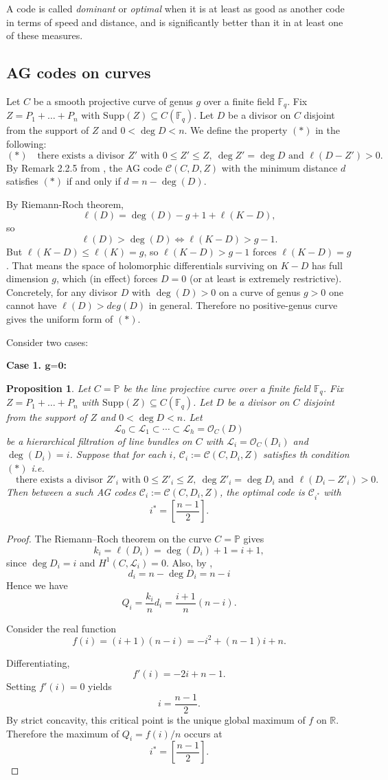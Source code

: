 \documentclass[14pt]{amsart}
\theoremstyle{plain}
\newtheorem{prop}[thm]{\bf Proposition}
\theoremstyle{definition}
\theoremstyle{remark}
\theoremstyle{example}
\def \P{\mathbb{P}}
\def \F{\mathbb{F}}
\def \RR{\mathbb{R}}
\def \L{\mathcal{L}}
\def \O{\mathcal{O}}
\def \C{\mathcal{C}}
\def \Supp{\mathrm{Supp}}
\begin{document}
A code is called \textit{dominant} or \textit{optimal} when it is at least as good as another code in terms of speed and distance, and is significantly better than it in at least one of these measures.

\subsection*{AG codes on curves}

Let $C$ be a smooth projective curve of genus $g$ over a finite field $\F_q$. Fix $Z=P_1+\ldots+P_n$ with $\Supp(Z)\subseteq C(\F_q)$. Let $D$ be a divisor on $C$ disjoint from the support of $Z$ and $0<\deg D<n$. We define the property $(*)$ in the following:
$$
(*)\quad\text{there exists a divisor }Z'\text{ with }0\leq Z'\leq Z,\ \deg Z'=\deg D\text{ and }\ell(D-Z')>0.
$$
By Remark 2.2.5 from \cite{St}, the AG code $\C(C,D,Z)$ with the minimum distance $d$ satisfies $(*)$ if and only if $d=n-\deg(D)$.

By Riemann-Roch theorem, 
$$\ell(D)=\deg(D)-g+1+\ell(K-D),$$
so
$$\ell(D)>\deg(D)\Longleftrightarrow\ell(K-D)>g-1.$$
But $\ell(K-D)\leq\ell(K)=g$, so $\ell(K-D)>g-1$ forces $\ell(K-D)=g$. That means the space of holomorphic differentials surviving on $K-D$ has full dimension $g$, which (in effect) forces $D=0$ (or at least is extremely restrictive). Concretely, for any divisor $D$ with 
$\deg(D)>0$ on a curve of genus $g>0$ one cannot have $\ell(D)>deg(D)$ in general. Therefore no positive-genus curve gives the uniform form of $(*)$. 

Consider two cases:

\noindent\textbf{Case 1. $\textbf{g=0}$:} 
\begin{prop} 
\label{prop:middle-layer-g=0}
Let $C=\P$ be the line projective curve over a finite field $\F_q$. Fix $Z=P_1+\ldots+P_n$ with $\Supp(Z)\subseteq C(\F_q)$. Let $D$ be a divisor on $C$ disjoint from the support of $Z$ and $0<\deg D<n$. 
Let $$\L_0\subset\L_1\subset\cdots\subset\L_h=\O_C(D)$$
be a hierarchical filtration of line bundles on $C$ with $\L_i=\O_C(D_i)$ and $\deg(D_i)=i$.
Suppose that for each $i$, $\C_i:=\C(C,D_i,Z)$ satisfies th condition $(*)$ i.e.
$$
\quad\text{there exists a divisor }Z'_i \text{ with }0\leq Z'_i\leq Z,\ \deg Z'_i=\deg D_i\text{ and }\ell(D_i-Z'_i)>0.
$$
Then between a such AG codes $\C_i:=\C(C,D_i,Z)$, the optimal code is $\C_{i^*}$ with $$i^*=\left[\frac{n-1}{2} \right].$$
\end{prop}
\begin{proof}
The Riemann–Roch theorem on the curve $C=\P$ gives
$$k_i=\ell(D_i)=\deg(D_i)+1=i+1,$$
since $\deg D_i=i$ and $H^1(C,\L_i)=0$. Also, by \cite[Remark 2.2.5]{St},
$$d_i=n-\deg D_i=n-i$$ 
Hence we have
$$Q_i=\frac{k_i}{n} d_i=\frac{i+1}{n}(n-i).$$

Consider the real function
$$f(i)=(i+1)(n-i)=-i^2+(n-1)i+n.$$

Differentiating,
$$f'(i)=-2i+n-1.$$
Setting $f'(i)=0$ yields
$$i=\frac{n-1}{2}.$$
By strict concavity, this critical point is the unique global maximum of $f$ on $\RR$. Therefore the maximum of $Q_i=f(i)/n$ occurs at
$$
i^*
=\left[ \frac{n-1}{2} \right].
$$
\end{proof}
\end{document}

